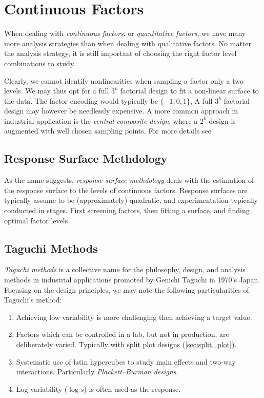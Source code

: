 \documentclass[12pt,a4paper]{report}
\theoremstyle{plain}
\theoremstyle{definition}
\providecommand{\DIFaddend}{} %
\begin{document}
\DIFaddend \section{Continuous Factors}
When dealing with \emph{continuous factors}, or \emph{quantitative factors}, we have many more analysis strategies than when dealing with qualitative factors.
No matter the analysis strategy, it is still important of choosing the right factor level combinations to study.

Clearly, we cannot identify nonlinearities when sampling a factor only a two levels.
We may thus opt for a full $3^k$ factorial design to fit a non-linear surface to the data.
The factor encoding would typically be $\{-1,0,1\}$,
A full $3^k$ factorial design may however be needlessly expensive. 
A more common approach in industrial application is the \emph{central composite design}, where a $2^k$ design is augmented with well chosen sampling points. 
For more details see \cite[Sec.6.6]{cox_theory_2000}


\subsection{Response Surface Methdology}
\label{sec:response_surface}
As the name suggests, \emph{response surface methdology} deals with the estimation of the response surface to the levels of continuous factors.
Response surfaces are typically assume to be (approximately) quadratic, and experimentation typically conducted in stages. First screening factors, then fitting a surface, and finding optimal factor levels.



\subsection{Taguchi Methods}
\emph{Taguchi methods} is a collective name for the philosophy, design, and analysis methods in industrial applications promoted by Genichi Taguchi in 1970's Japan.
Focusing on the design principles, we may note the following particularities of Taguchi's method:
\begin{enumerate}
\item Achieving low variability is more challenging then achieving a target value. 
\item Factors which can be controlled in a lab, but not in production, are deliberately varied. Typically with split plot  designs (\ref{sec:split_plot}).
\item Systematic use of latin hypercubes to study main effects and two-way interactions. Particularly \emph{Plackett–Burman designs}.
\item Log variability ($\log s$) is often used as the response.
\end{enumerate}
\end{document}
